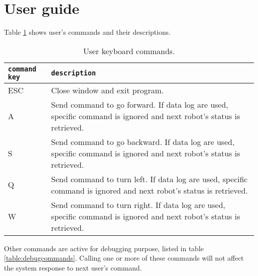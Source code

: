 \section{User guide}
\label{sourcecode:userguide}

Table \ref{table:usercommands} shows user's commands and their descriptions.

\begin{table}[!h]
  \centering  
  \begin{tabular}{| l | l |}

    \hline
    \texttt{command key} &
    \texttt{description} \\

    \hline
    \small {ESC} &
    \parbox[t]{9cm}{\raggedright \small
      Close window and exit program.} \\  [1ex]

    \hline
    \small {A} &
    \parbox[t]{9cm}{\raggedright \small
      Send command to go forward. If data log are used, specific command is ignored
      and next robot's status is retrieved.} \\  [1ex]

    \hline
    \small {S} &
    \parbox[t]{9cm}{\raggedright \small
      Send command to go backward. If data log are used, specific command is ignored
      and next robot's status is retrieved.} \\  [1ex]

    \hline
    \small {Q} &
    \parbox[t]{9cm}{\raggedright \small
      Send command to turn left. If data log are used, specific command is ignored
      and next robot's status is retrieved.} \\  [1ex]

    \hline
    \small {W} &
    \parbox[t]{9cm}{\raggedright \small
      Send command to turn right. If data log are used, specific command is ignored
      and next robot's status is retrieved.} \\  [1ex]

    \hline

  \end{tabular}
  \caption{User keyboard commands.}
  \label{table:usercommands}
\end{table}

Other commands are active for debugging purpose, listed
in table \ref{table:debugcommands}. Calling one or more of
these commands will not affect the system response to next
user's command.

